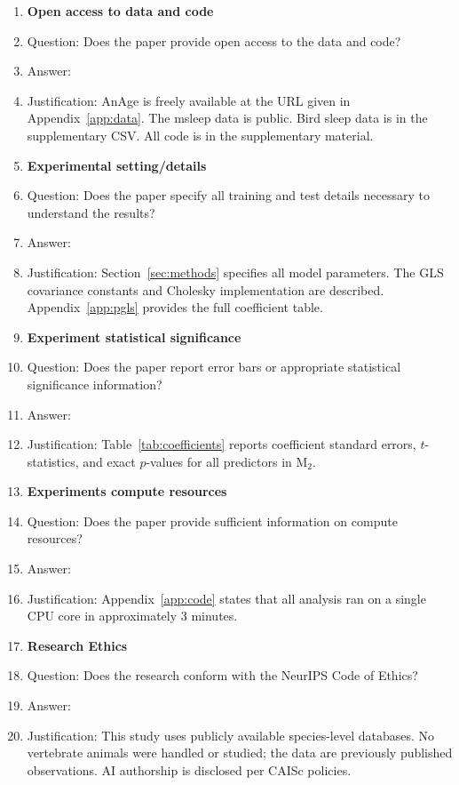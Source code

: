 \documentclass{article}
\begin{document}
\begin{enumerate}
\item {\bf Open access to data and code}
    \item[] Question: Does the paper provide open access to the data and code?
    \item[] Answer: \answerYes{}
    \item[] Justification: AnAge is freely available at the URL given in Appendix~\ref{app:data}. The msleep data is public. Bird sleep data is in the supplementary CSV. All code is in the supplementary material.

\item {\bf Experimental setting/details}
    \item[] Question: Does the paper specify all training and test details necessary to understand the results?
    \item[] Answer: \answerYes{}
    \item[] Justification: Section~\ref{sec:methods} specifies all model parameters. The GLS covariance constants and Cholesky implementation are described. Appendix~\ref{app:pgls} provides the full coefficient table.

\item {\bf Experiment statistical significance}
    \item[] Question: Does the paper report error bars or appropriate statistical significance information?
    \item[] Answer: \answerYes{}
    \item[] Justification: Table~\ref{tab:coefficients} reports coefficient standard errors, $t$-statistics, and exact $p$-values for all predictors in M$_2$.

\item {\bf Experiments compute resources}
    \item[] Question: Does the paper provide sufficient information on compute resources?
    \item[] Answer: \answerYes{}
    \item[] Justification: Appendix~\ref{app:code} states that all analysis ran on a single CPU core in approximately 3 minutes.

\item {\bf Research Ethics}
    \item[] Question: Does the research conform with the NeurIPS Code of Ethics?
    \item[] Answer: \answerYes{}
    \item[] Justification: This study uses publicly available species-level databases. No vertebrate animals were handled or studied; the data are previously published observations. AI authorship is disclosed per CAISc policies.


\end{enumerate}
\end{document}
